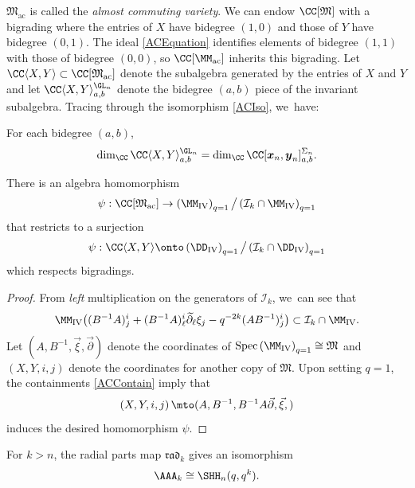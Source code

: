 $\mathfrak{M}_{\textrm{ac}}$ is called the \textit{almost commuting variety}.
We can endow $\CC[\mathfrak{M}]$ with a bigrading where the entries of $X$ have bidegree $(1,0)$ and those of $Y$ have bidegree $(0,1)$.
The ideal \eqref{ACEquation} identifies elements of bidegree $(1,1)$ with those of bidegree $(0,0)$, so $\CC[\MM_{\mathrm{ac}}]$ inherits this bigrading.
Let $\CC\langle X,Y\rangle\subset\CC[\mathfrak{M}_{\mathrm{ac}}]$ denote the subalgebra generated by the entries of $X$ and $Y$ and let $\CC\langle X,Y\rangle^{\GL_n}_{a,b}$ denote the bidegree $(a,b)$ piece of the invariant subalgebra.
Tracing through the isomorphism \eqref{ACIso}, we~have:
\begin{cor}\label{ACCor}
For each bidegree $(a,b)$,
\[
\dim_\CC\CC\langle X,Y\rangle_{a,b}^{\GL_n}=\dim_\CC\CC[\boldsymbol{x}_n,\boldsymbol{y}_n]^{\Sigma_n}_{a,b}.
\]
\end{cor}

\begin{lem}\label{ACLem}
There is an algebra homomorphism
\[
\psi:\CC[\mathfrak{M}_{\mathrm{ac}}]\to\left(\MM_{\mathrm{IV}}\right)_{q=1}\big/\left(\mathcal{I}_k\cap\MM_{\mathrm{IV}}\right)_{q=1}
\]
that restricts to a surjection
\[
\psi:\CC\langle X,Y\rangle\onto\left(\DD_{\mathrm{IV}} \right)_{q=1}\big/\left(\mathcal{I}_k\cap\DD_{\mathrm{IV}}\right)_{q=1}
\]
which respects bigradings.
\end{lem}

\begin{proof}
From \textit{left} multiplication on the generators of $\mathcal{I}_k$, we~can see that
\begin{equation}
\MM_{\mathrm{IV}}\big((B^{-1}A)^i_j+(B^{-1}A)^i_\ell\widetilde{\partial}_{\ell}\xi_j-q^{-2k}(AB^{-1})^i_j\big)\subset\mathcal{I}_k\cap\MM_{\mathrm{IV}}.
\label{ACContain}
\end{equation}
Let $(A,B^{-1},\vec{\xi},\vec{\partial})$ denote the coordinates of $\mathrm{Spec}\left(\MM_{\mathrm{IV}}\right)_{q=1}\cong\mathfrak{M}$ and $(X,Y, i, j)$ denote the coordinates for another copy of $\mathfrak{M}$.
Upon setting $q=1$, the containments \eqref{ACContain} imply that
\[
\left(X,Y,i, j\right)\mto(A, B^{-1}, B^{-1}A\vec{\partial},\vec{\xi},)
\]
induces the desired homomorphism $\psi$.
\end{proof}

\begin{thm}\label{qkCaseThm}
For $k>n$, the radial parts map $\mathfrak{rad}_k$ gives an isomorphism
\[
\AAA_k\cong\SHH_n(q,q^k).
\]
\end{thm}

